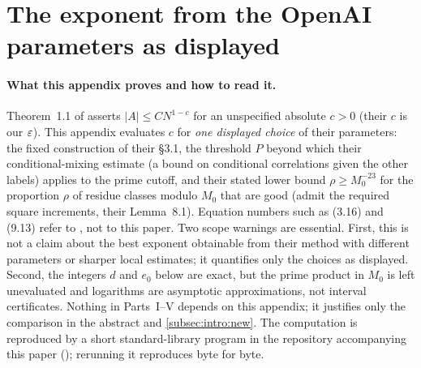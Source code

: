 \section{The exponent from the OpenAI parameters as displayed}\label{app:openai-constant}

\paragraph{What this appendix proves and how to read it.}
Theorem~1.1 of \cite{OpenAI} asserts $|A|\le CN^{1-c}$ for an
unspecified absolute $c>0$ (their $c$ is our $\varepsilon$). This appendix
evaluates $c$ for \emph{one displayed choice} of their parameters:
the fixed construction of their \S3.1, the threshold $P$
beyond which their conditional-mixing estimate (a bound on
conditional correlations given the other labels) applies to the
prime cutoff, and their stated lower bound $\rho\ge M_0^{-23}$
for the proportion $\rho$ of residue classes modulo $M_0$ that
are good (admit the required square increments, their
Lemma~8.1). Equation
numbers such as (3.16) and (9.13) refer to \cite{OpenAI}, not to
this paper. Two scope warnings are essential. First, this is not a
claim about the best exponent obtainable from their method with
different parameters or sharper local estimates; it quantifies only
the choices as displayed. Second, the integers $d$ and $e_0$ below
are exact, but the prime product in $M_0$ is left unevaluated and
logarithms are asymptotic approximations, not interval
certificates. Nothing in Parts~I--V depends on this appendix; it
justifies only the comparison in the abstract and
\cref{subsec:intro:new}. The computation is reproduced by a short
standard-library program in the repository accompanying this paper
(); rerunning
it reproduces
byte for byte.


